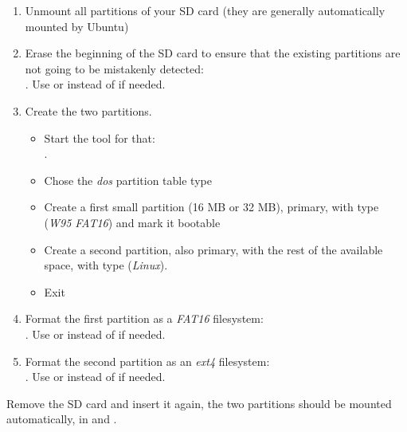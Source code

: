 \begin{enumerate}

\item Unmount all partitions of your SD card (they are generally
  automatically mounted by Ubuntu)

\item Erase the beginning of the SD card to ensure that the existing
  partitions are not going to be mistakenly detected:\\
  . Use
   or  instead of  if needed.

\item Create the two partitions.

  \begin{itemize}

  \item Start the  tool for that:\\
    .

  \item Chose the {\em dos} partition table type

  \item Create a first small partition (16 MB or 32 MB), primary, with
    type  ({\em W95 FAT16}) and mark it bootable

  \item Create a second partition, also primary, with the rest of the
    available space, with type  ({\em Linux}).

  \item Exit 

  \end{itemize}

\item Format the first partition as a {\em FAT16} filesystem:\\
  . Use 
  or  instead of  if needed.

\item Format the second partition as an {\em ext4} filesystem:\\
  . Use
   or  instead of  if needed.

\end{enumerate}

Remove the SD card and insert it again, the two partitions should be
mounted automatically, in  and
.


